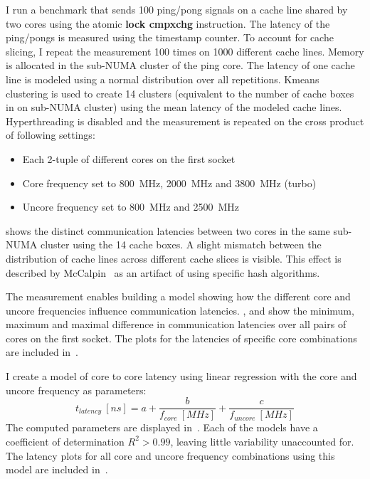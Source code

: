 I run a benchmark that sends \SI{100}{} ping/pong signals on a cache line shared by two cores using the atomic \textbf{lock cmpxchg} instruction.
The latency of the ping/pongs is measured using the timestamp counter.
To account for cache slicing, I repeat the measurement \SI{100}{} times on \SI{1000}{} different cache lines.
Memory is allocated in the sub-NUMA cluster of the ping core.
The latency of one cache line is modeled using a normal distribution over all repetitions.
Kmeans clustering is used to create \SI{14}{} clusters (equivalent to the number of cache boxes in on sub-NUMA cluster) using the mean latency of the modeled cache lines.
Hyperthreading is disabled and the measurement is repeated on the cross product of following settings:
\begin{itemize}
    \item Each 2-tuple of different cores on the first socket
    \item Core frequency set to \SI{800}{\MHz}, \SI{2000}{\MHz} and \SI{3800}{\MHz} (turbo)
    \item Uncore frequency set to \SI{800}{\MHz} and \SI{2500}{\MHz}
\end{itemize}

 shows the distinct communication latencies between two cores in the same sub-NUMA cluster using the \SI{14}{} cache boxes.
A slight mismatch between the distribution of cache lines across different cache slices is visible.
This effect is described by McCalpin~\cite{McCalpin_2018_IntelAddressHashing} as an artifact of using specific hash algorithms.

The measurement enables building a model showing how the different core and uncore frequencies influence communication latencies.
,  and  show the minimum, maximum and maximal difference in communication latencies over all pairs of cores on the first socket.
The plots for the latencies of specific core combinations are included in~.

I create a model of core to core latency using linear regression with the core and uncore frequency as parameters:
\begin{equation*}
t_{latency}~[ns] = a + \frac{b}{f_{core}~[MHz]} + \frac{c}{f_{uncore}~[MHz]}
\end{equation*}
The computed parameters are displayed in~.
Each of the models have a coefficient of determination $R^2 > 0.99$, leaving little variability unaccounted for.
The latency plots for all core and uncore frequency combinations using this model are included in~.


